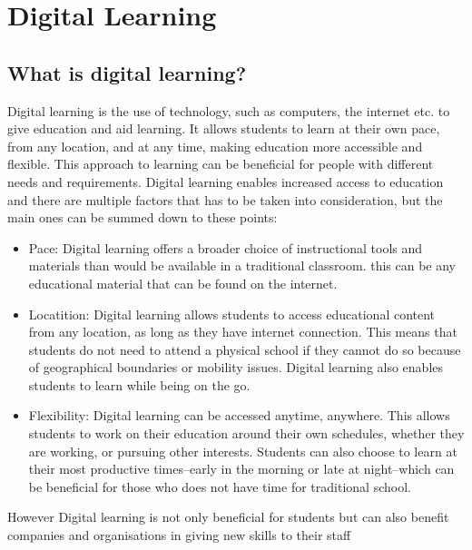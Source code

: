 \section{Digital Learning}\label{sec:digitalLearning}
\subsection{What is digital learning?}\label{subsec:whatIsDigitalLearning}

Digital learning is the use of technology, such as computers, the internet etc. to give education and aid learning. It allows students to learn at their own pace, from any location, and at any time, making education more accessible and flexible. 
This approach to learning can be beneficial for people with different needs and requirements. Digital learning enables increased access to education and there are multiple factors that has to be taken into consideration, but the main ones can be summed down to these points\cite{gosa2023}:

\begin{itemize}
\item Pace:
	Digital learning offers a broader choice of instructional tools and materials than would be available in a traditional classroom. this can be any educational material that can be found on the internet.\cite{gosa2023}
\item Locatition:
	  Digital learning allows students to access educational content from any location, as long as they have internet connection. This means that students do not need to attend a physical school if they cannot do so because of geographical boundaries or mobility issues. Digital learning also enables students to learn while being on the go.\cite{gosa2023}
\item Flexibility:
	Digital learning can be accessed anytime, anywhere. This allows students to work on their education around their own schedules, whether they are working, or pursuing other interests. Students can also choose to learn at their most productive times--early in the morning or late at night--which can be  beneficial for those who does not have time for traditional school.\cite{gosa2023}
\end{itemize}

However Digital learning is not only beneficial for students but can also benefit companies and organisations in giving new skills to their staff\cite{SkillsDigitalLearning}

